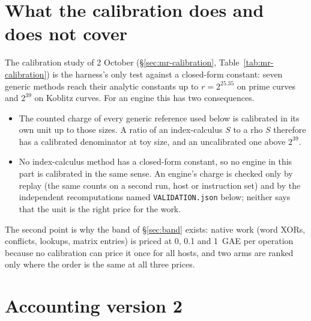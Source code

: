 \section{What the calibration does and does not cover}\label{sec:em-calibration}

The calibration study of 2 October (\S\ref{sec:mr-calibration},
Table~\ref{tab:mr-calibration}) is the harness's only test against a
closed-form constant: seven generic methods reach their analytic constants
up to $r=2^{25.35}$ on prime curves and $2^{39}$ on Koblitz curves. For an
engine this has two consequences.
\begin{itemize}
\item The counted charge of every generic reference used below is
  calibrated in its own unit up to those sizes. A ratio of an
  index-calculus $S$ to a rho $S$ therefore has a calibrated denominator at
  toy size, and an uncalibrated one above $2^{39}$.
\item No index-calculus method has a closed-form constant, so no engine in
  this part is calibrated in the same sense. An engine's charge is
  checked only by replay (the same counts on a second run, host or
  instruction set) and by the independent recomputations named
  \texttt{VALIDATION.json} below; neither says that the unit is the right
  price for the work.
\end{itemize}
The second point is why the band of \S\ref{sec:band} exists: native work
(word XORs, conflicts, lookups, matrix entries) is priced at 0, 0.1 and
1~GAE per operation because no calibration can price it once for all
hosts, and two arms are ranked only where the order is the same at all
three prices.

\section{Accounting version 2}\label{sec:em-accounting}

